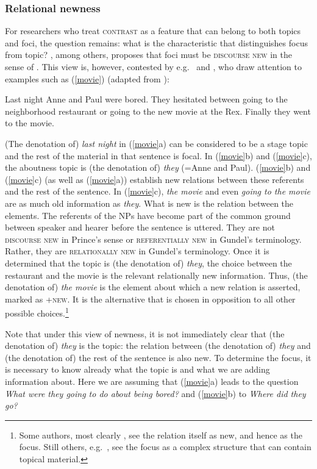 \documentclass[output=paper,hidelinks]{langscibook}
\begin{document}
\subsubsection{Relational newness} \label{new}
\largerpage

For researchers who treat \textsc{contrast} as a feature that can belong to both topics and foci, the question remains: what is the characteristic that distinguishes focus from topic? \citet{Choi1996}, among others, proposes that foci must be \textsc{discourse new} in the sense of \citet{Prince}. This view is, however, contested by e.g.\ \citet{Lambrecht} and \citet{Gundel74}, who draw attention to examples such as (\ref{movie}) (adapted from \citealt{Lambrecht}):
 
\ea \label{movie}
\ea Last night Anne and Paul were bored. 
\ex They hesitated between going to the neighborhood restaurant or going to the new movie at the Rex. 
\ex Finally they went to the movie.
\z\z

\noindent (The denotation of) \textit{last night} in (\ref{movie}a) can be considered to be a stage topic and the rest of the material in that sentence is focal. In (\ref{movie}b) and (\ref{movie}c), the aboutness topic is (the denotation of) \textit{they} (=Anne and Paul). (\ref{movie}b) and (\ref{movie}c)  (as well as (\ref{movie}a)) establish new relations between these referents and the rest of the sentence. In (\ref{movie}c), \textit{the movie} and even \textit{going to the movie} are as much old information as \textit{they}. What is new is the relation between the elements. The referents of the NPs have become part of the common ground between speaker and hearer before the sentence is uttered. They are not \textsc{discourse new} in Prince's sense or \textsc{referentially new} in Gundel's terminology. Rather, they are \textsc{relationally new} in Gundel's terminology. Once it is determined that the topic is (the denotation of) \textit{they}, the choice between the restaurant and the movie is the relevant relationally new information. Thus, (the denotation of) \textit{the movie} is the element about which a new relation is asserted, marked as \textsc{+new}.  It is the alternative that is chosen in opposition to all other possible choices.\footnote{ Some authors, most clearly \citet{Lambrecht}, see the relation itself as new, and hence as the focus. Still others, e.g.\ \citet{Erteschik-Shir2007}, see the focus as a complex structure that can contain topical material.}

Note that under this view of newness, it is not immediately clear that (the denotation of) \textit{they} is the topic: the relation between (the denotation of) \textit{they} and (the denotation of) the rest of the sentence is also new.  To determine the focus, it is necessary to know already what the topic is and  what we are adding information about.  Here we are assuming that (\ref{movie}a) leads to the question \textit{What were they going to do about being bored?} and (\ref{movie}b) to \textit{Where did they go?}
\end{document}
